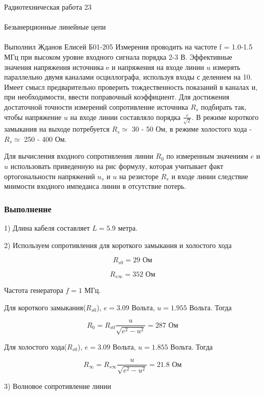 \documentclass{astroedu-lab}
\begin{document}
\begin{problem}{\huge Радиотехническая работа 23\\\\Безынерционные линейные цепи\\\\Выполнил Жданов Елисей Б01-205}
Измерения проводить на частоте f = 1.0-1.5 МГц при высоком уровне входного сигнала порядка 2-3 В. Эффективные значения напряжения источника e и напряжения на входе линии $u$ измерять параллельно двумя каналами осциллографа, используя входы с делением на 10. Имеет смысл предварительно проверить тождественность показаний в каналах и, при необходимости, ввести поправочный коэффициент. Для достижения достаточной точности измерений сопротивление источника $R_s$ подбирать так, чтобы напряжение $u$ на входе линии составляло порядка $\frac{e}{\sqrt{2}}$. В режиме короткого замыкания на выходе потребуется $R_s \simeq $ 30 - 50 Ом, в режиме холостого хода - $R_s \simeq$ 250 - 400 Ом.

Для вычисления входного сопротивления линии $R_0$ по измеренным значениям $e$ и $u$ использовать приведенную на рис формулу, которая учитывает факт ортогональности напряжений $u_s$ и $u$ на резисторе $R_s$ и входе линии следствие мнимости входного импеданса линии в отсутствие потерь.

\subsubsection{Выполнение}

1) Длина кабеля составляет $L = 5.9$ метра.

2) Используем сопротивления для короткого замыкания и холостого хода

\begin{equation}
	R_{s0} = 29 \text{ Ом}
\end{equation}

\begin{equation}
	R_{s \infty} = 352 \text{ Ом}
\end{equation}

Частота генератора $f = 1$ МГц.

Для короткого замыкания($R_{s0}$), $e = 3.09$ Вольта, $u = 1.955$ Вольта. Тогда

\begin{equation}
	R_0 = R_{s0} \frac{u}{\sqrt{e^2 - u^2}} = 287 \text{ Ом}
\end{equation}

Для холостого хода($R_{s0}$), $e = 3.09$ Вольта, $u = 1.855$ Вольта. Тогда

\begin{equation}
	R_{\infty} = R_{s\infty} \frac{u}{\sqrt{e^2 - u^2}} = 21.8 \text{ Ом}
\end{equation}

3) Волновое сопротивление линии


\end{problem}
\end{document}

